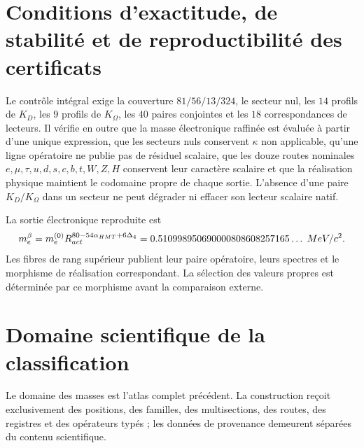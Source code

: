 \section{Conditions d'exactitude, de stabilité et de reproductibilité des certificats}
\label{sec:ejecucion-tabla-masas-acumulativa}

Le contrôle intégral exige la couverture \(81/56/13/324\), le secteur nul, les
\(14\) profils de \(K_D\), les \(9\) profils de \(K_\Omega\), les
\(40\) paires conjointes et les \(18\) correspondances de lecteurs. Il vérifie
en outre que la masse électronique raffinée est évaluée à partir d'une unique expression,
que les secteurs nuls conservent \(\kappa\) non applicable, qu'une ligne
opératoire ne publie pas de résiduel scalaire, que les douze routes nominales
\(e,\mu,\tau,u,d,s,c,b,t,W,Z,H\) conservent leur caractère scalaire et que la
réalisation physique maintient le codomaine propre de chaque sortie. L'absence d'une paire
\(K_D/K_\Omega\) dans un secteur ne peut dégrader ni effacer son lecteur scalaire
natif.

La sortie électronique reproduite est
\[
m_e^\beta
=m_e^{(0)}R_{\rm act}^{80-54\alpha_{\rm HMT}+6\Delta_4}
=0.510998950690000808608257165\ldots\;\mathrm{MeV}/c^2.
\]
Les fibres de rang supérieur publient leur paire opératoire, leurs spectres et le
morphisme de réalisation correspondant. La sélection des valeurs propres est
déterminée par ce morphisme avant la comparaison externe.


\section{Domaine scientifique de la classification}
\label{sec:alcance-publico-apendices-acumulativo}

Le domaine des masses est l'atlas complet précédent. La construction reçoit
exclusivement des positions, des familles, des multisections, des routes, des registres et des
opérateurs typés ; les données de provenance demeurent séparées du contenu
scientifique.
